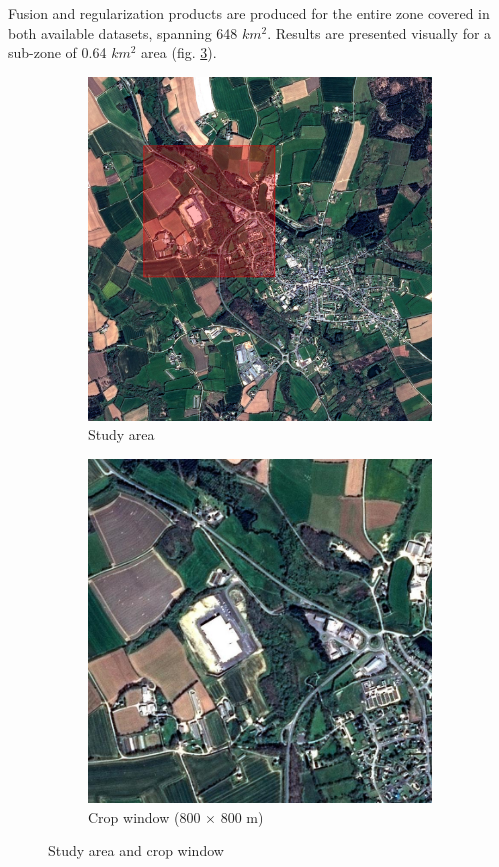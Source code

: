 \documentclass[10pt]{article}
\begin{document}
Fusion and regularization products are produced for the entire zone covered in both available datasets, spanning 648 $km^2$. Results are presented visually for a sub-zone of 0.64 $km^2$ area (fig.  \ref{fig:area}).
\begin{figure}[H]
    \centering
    \begin{subfigure}{0.49\textwidth}
        \centering
        \includegraphics[width=.9\textwidth]{Im_SPOT6}
        \caption{Study area}
        \label{fig:areaBig}
    \end{subfigure}
    \hfill
    \begin{subfigure}{0.49\textwidth}
        \centering
        \includegraphics[width=.9\textwidth]{Im_SPOT6_crop}
        \caption{Crop window (800 $\times$ 800 m)}
        \label{fig:areaSmall}
    \end{subfigure}
    \caption{Study area and crop window}
    \label{fig:area}
    \centering
\end{figure}
\end{document}
